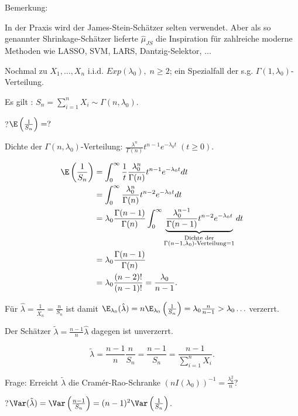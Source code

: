 \documentclass{tstextbook}
\begin{document}
	\begin{remark}
		Bemerkung: 
		
		In der Praxis wird der James-Stein-Schätzer selten verwendet. Aber als so genannter Shrinkage-Schätzer lieferte $ \hat{\mu}_{JS} $ die Inspiration für zahlreiche moderne Methoden wie LASSO, SVM, LARS, Dantzig-Selektor, $ \ldots $
	\end{remark}

\begin{example}
	Nochmal zu $ X_1,\ldots, X_n $ i.i.d. $ Exp(\lambda_0), \; n \ge 2 $; ein Spezialfall der s.g. $ \Gamma(1,\lambda_0) $-Verteilung. 
	
	Es gilt : $ S_n = \sum_{i=1}^{n}X_i \sim \Gamma(n,\lambda_0) $. 
	
	?$ \E\left(\frac{1}{S_n}\right)= ? $
	
	Dichte der $ \Gamma(n,\lambda_0) $-Verteilung: $ \frac{\lambda^n}{\Gamma(n)}t^{n-1}e^{-\lambda_0t} \; (t\ge0) $.
	
	\[
	\begin{aligned}
		\E\left(\frac{1}{S_n}\right) & = \int_{0}^{\infty}\frac{1}{t}\frac{\lambda_0^n}{\Gamma(n)}t^{n-1}e^{-\lambda_0t}dt \\
		& = \int_{0}^{\infty}\frac{\lambda_0^n}{\Gamma(n)}t^{n-2}e^{-\lambda_0t}dt \\
		& = \lambda_0 \frac{\Gamma(n-1)}{\Gamma(n)}\int_{0}^{\infty}\underbrace{\frac{\lambda_0^{n-1}}{\Gamma(n-1)}t^{n-2}e^{-\lambda_0 t}}_{\substack{\text{Dichte der} \\ \Gamma(n-1,\lambda_0)\text{-Verteilung}=1}}dt \\
		& = \lambda_0 \frac{\Gamma(n-1)}{\Gamma(n)} \\
		& =  \lambda_0 \frac{(n-2)!}{(n-1)!} = \frac{\lambda_0}{n-1}.
	\end{aligned}
	\]
	
	Für $ \hat{\lambda} = \frac{1}{\bar{X}_n} = \frac{n}{S_n} $ ist damit $ \E_{\lambda_0}(\hat{\lambda}) = n\E_{\lambda_0}\left(\frac{1}{S_n}\right) = \lambda_0 \frac{n}{n-1} > \lambda_0 \ldots $ verzerrt.
	
	Der Schätzer $ \tilde{\lambda} = \frac{n-1}{n}\hat{\lambda} $ dagegen ist unverzerrt. 
	
	\[ \tilde{\lambda} = \frac{n-1}{n}\frac{n}{S_n} = \frac{n-1}{S_n} = \frac{n-1}{\sum_{i=1}^{n}X_i} . \] 
	
	Frage: Erreicht $ \tilde{\lambda} $ die Cramér-Rao-Schranke $ (nI(\lambda_0))^{-1} = \frac{\lambda_0^2}{n} $?
	
	?$ \Var(\tilde{\lambda}) = \Var\left(\frac{n-1}{S_n}\right) = (n-1)^2 \Var\left(\frac{1}{S_n}\right) $. 
	

\end{example}
\end{document}
